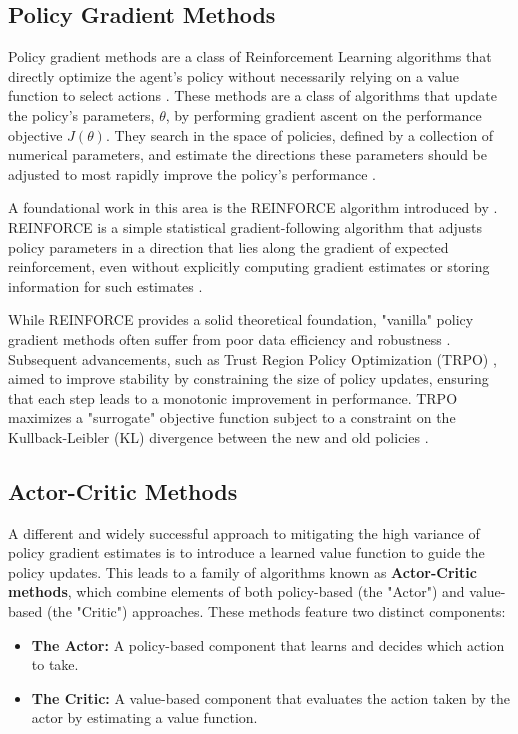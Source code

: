 \subsection{Policy Gradient Methods}
Policy gradient methods are a class of Reinforcement Learning algorithms that directly optimize the agent's policy without necessarily relying on a value function to select actions \cite{Sutton2018ReinforcementL}. These methods are a class of algorithms that update the policy's parameters, $\theta$, by performing gradient ascent on the performance objective $J(\theta)$. They search in the space of policies, defined by a collection of numerical parameters, and estimate the directions these parameters should be adjusted to most rapidly improve the policy's performance \cite{Sutton2018ReinforcementL}.

A foundational work in this area is the REINFORCE algorithm introduced by \cite{Williams1992Simple}. REINFORCE is a simple statistical gradient-following algorithm that adjusts policy parameters in a direction that lies along the gradient of expected reinforcement, even without explicitly computing gradient estimates or storing information for such estimates \cite{Williams1992Simple}. 

While REINFORCE provides a solid theoretical foundation, "vanilla" policy gradient methods often suffer from poor data efficiency and robustness \cite{Schulman2017ProximalPO}. Subsequent advancements, such as Trust Region Policy Optimization (TRPO) \cite{Schulman2015TrustRP}, aimed to improve stability by constraining the size of policy updates, ensuring that each step leads to a monotonic improvement in performance. TRPO maximizes a "surrogate" objective function subject to a constraint on the Kullback-Leibler (KL) divergence between the new and old policies \cite{Schulman2017ProximalPO}.


\subsection{Actor-Critic Methods}
A different and widely successful approach to mitigating the high variance of policy gradient estimates is to introduce a learned value function to guide the policy updates. This leads to a family of algorithms known as \textbf{Actor-Critic methods}, which combine elements of both policy-based (the "Actor") and value-based (the "Critic") approaches. These methods feature two distinct components:
\begin{itemize}
    \item \textbf{The Actor:} A policy-based component that learns and decides which action to take.
    \item \textbf{The Critic:} A value-based component that evaluates the action taken by the actor by estimating a value function.
\end{itemize}

